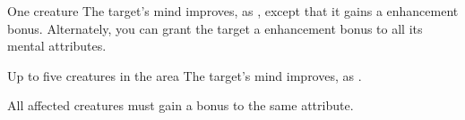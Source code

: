 \begin{spellheader}
    \spellrng{\rngtouch}
    \spelldur{\durshort}
\end{spellheader}
\begin{spelleffects}
    \begin{spelltarget}{One creature}
        \spelleffect The target's mind improves, as , except that it gains a  enhancement bonus. Alternately, you can grant the target a  enhancement bonus to all its mental attributes.
    \end{spelltarget}
\end{spelleffects}
\begin{spellfooter}
    
\end{spellfooter}

\begin{spellheader}
\end{spellheader}
\begin{spelleffects}
    \begin{spelltargets}{Up to five creatures in the area}
        \spelleffect The target's mind improves, as . 
    \end{spelltargets}
\end{spelleffects}
\begin{spellfooter}
    \spellnotes All affected creatures must gain a bonus to the same attribute.
\end{spellfooter}


